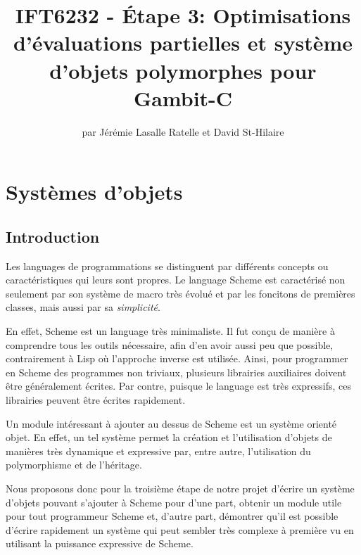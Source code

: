 \documentclass[letterpaper,12pt]{book}
\begin{document}
\title{IFT6232 - Étape 3: Optimisations d'évaluations partielles et
  système d'objets polymorphes pour Gambit-C}

\author{par Jérémie Lasalle Ratelle et David St-Hilaire}
\maketitle

\clearpage

\tableofcontents

\clearpage

\chapter{Systèmes d'objets}

\section{Introduction}

Les languages de programmations se distinguent par différents concepts
ou caractéristiques qui leurs sont propres. Le language Scheme est
caractérisé non seulement par son système de macro très évolué et par
les foncitons de premières classes, mais aussi par sa
\emph{simplicité}.

En effet, Scheme est un language très minimaliste. Il fut conçu de
manière à comprendre tous les outils nécessaire, afin d'en avoir aussi
peu que possible, contrairement à Lisp où l'approche inverse est
utilisée. Ainsi, pour programmer en Scheme des programmes non
triviaux, plusieurs librairies auxiliaires doivent être généralement
écrites. Par contre, puisque le language est très expressifs, ces
librairies peuvent être écrites rapidement.

Un module intéressant à ajouter au dessus de Scheme est un système
orienté objet. En effet, un tel système permet la création et
l'utilisation d'objets de manières très dynamique et expressive par,
entre autre, l'utilisation du polymorphisme et de l'héritage.

Nous proposons donc pour la troisième étape de notre projet d'écrire
un système d'objets pouvant s'ajouter à Scheme pour d'une part,
obtenir un module utile pour tout programmeur Scheme et, d'autre part,
démontrer qu'il est possible d'écrire rapidement un système qui peut
sembler très complexe à première vu en utilisant la puissance
expressive de Scheme.
\end{document}
